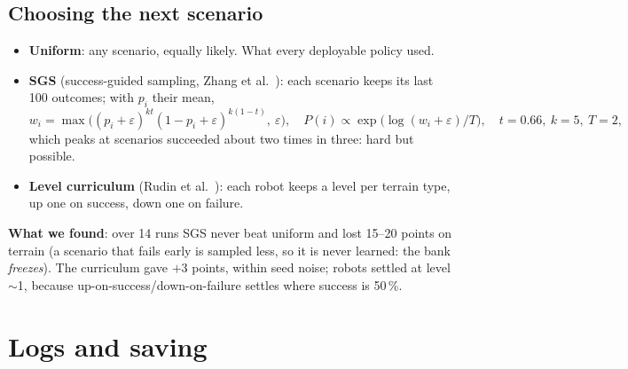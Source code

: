 \documentclass[10pt,letterpaper]{article}
\newcommand{\key}[1]{\textbf{#1}}
\begin{document}
\subsection{Choosing the next scenario}
\begin{itemize}
\item \key{Uniform}: any scenario, equally likely. What every deployable policy used.
\item \key{SGS} (success-guided sampling, Zhang et al.~\cite{zhang2026}): each scenario keeps its last 100 outcomes; with $p_i$ their mean,
\[ w_i=\max\big((p_i+\varepsilon)^{kt}(1-p_i+\varepsilon)^{k(1-t)},\ \varepsilon\big),\quad P(i)\propto \exp\big(\log(w_i+\varepsilon)/T\big),\quad t=0.66,\ k=5,\ T=2, \]
which peaks at scenarios succeeded about two times in three: hard but possible.
\item \key{Level curriculum} (Rudin et al.~\cite{rudin2021}): each robot keeps a level per terrain type, up one on success, down one on failure.
\end{itemize}
\textbf{What we found}: over 14 runs SGS never beat uniform and lost 15–20 points on terrain (a scenario that fails early is
sampled less, so it is never learned: the bank \emph{freezes}). The curriculum gave $+3$ points, within seed noise; robots settled
at level $\sim$1, because up-on-success/down-on-failure settles where success is 50\,\%.

\section{Logs and saving}
\end{document}
